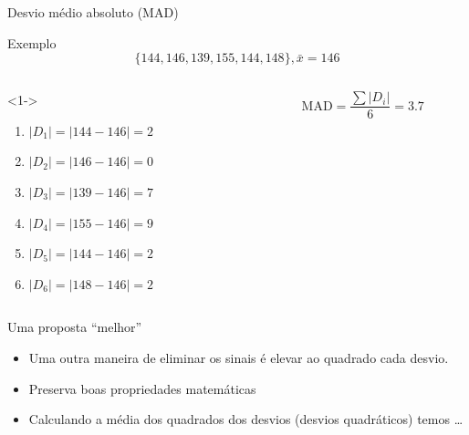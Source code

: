 \documentclass{beamer}
\begin{document}
\begin{frame}{\scriptsize Desvio médio absoluto (MAD)}
  \begin{exampleblock}{Exemplo}
    \footnotesize
  \begin{displaymath}
    \{144, 146, 139, 155, 144, 148\}, \bar{x} = 146
  \end{displaymath}
  \begin{columns}
    \begin{column}{5cm}<1->
      \begin{enumerate}
        \tiny
      \item $|D_1| = |144 - 146| = 2$
      \item $|D_2| = |146 - 146| = 0$
      \item $|D_3| = |139 - 146| = 7$
      \item $|D_4| = |155 - 146| = 9$
      \item $|D_5| = |144 - 146| = 2$
      \item $|D_6| = |148 - 146| = 2$
      \end{enumerate}
    \end{column}
    \begin{column}{5cm}
      \begin{displaymath}
        \mathrm{MAD} = \frac{\sum |D_i|}{6} = 3.7
      \end{displaymath}
    \end{column}
  \end{columns}
\end{exampleblock}
\end{frame}

\begin{frame}{\scriptsize Uma proposta ``melhor''}
  \begin{itemize}
    \footnotesize
  \item Uma outra maneira de eliminar os sinais é elevar ao quadrado
    cada desvio.
  \item Preserva boas propriedades matemáticas
  \item Calculando a média dos quadrados dos desvios (desvios
    quadráticos) temos \ldots
  \end{itemize}
\end{frame}
\end{document}
